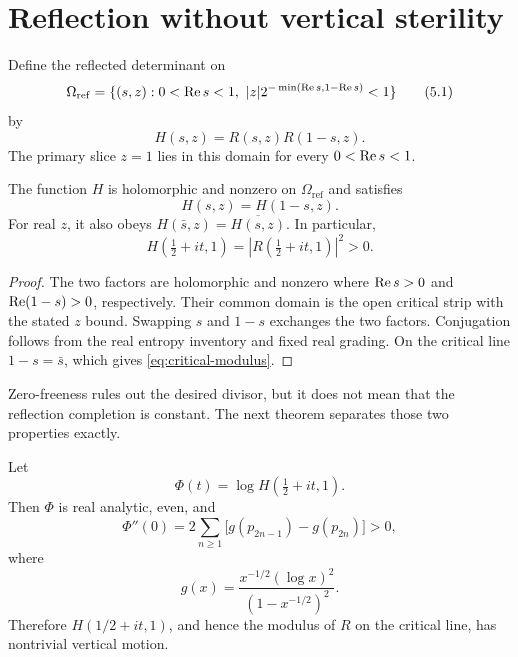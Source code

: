 \section{Reflection without vertical sterility}
\label{sec:reflection}

Define the reflected determinant on
\[
 \Omega_{\mathrm{ref}}=
 \{(s,z):0<\operatorname{Re} s<1,\
 |z|2^{-\min(\operatorname{Re} s,1-\operatorname{Re} s)}<1\}       \tag{5.1}
\]
by
\[
 H(s,z)=R(s,z)R(1-s,z).                         \tag{5.2}
\]
The primary slice $z=1$ lies in this domain for every $0<\operatorname{Re} s<1$.

\begin{theorem}
\label{thm:reflection}
The function $H$ is holomorphic and nonzero on $\Omega_{\mathrm{ref}}$ and
satisfies
\[
 H(s,z)=H(1-s,z).                               \tag{5.3}
\]
For real $z$, it also obeys
$H(\bar s,z)=\overline{H(s,z)}$.  In particular,
\[
 H(\tfrac12+it,1)=|R(\tfrac12+it,1)|^2>0.      \tag{5.4}
 \label{eq:critical-modulus}
\]
\end{theorem}

\begin{proof}
The two factors are holomorphic and nonzero where $\operatorname{Re} s>0$ and
$\operatorname{Re}(1-s)>0$, respectively.  Their common domain is the open critical
strip with the stated $z$ bound.  Swapping $s$ and $1-s$ exchanges the two
factors.  Conjugation follows from the real entropy inventory and fixed real
grading.  On the critical line $1-s=\bar s$, which gives \eqref{eq:critical-modulus}.
\end{proof}

Zero-freeness rules out the desired divisor, but it does not mean that the
reflection completion is constant.  The next theorem separates those two
properties exactly.

\begin{theorem}
\label{thm:motion}
Let
\[
 \Phi(t)=\log H(\tfrac12+it,1).
\]
Then $\Phi$ is real analytic, even, and
\[
 \Phi''(0)=2\sum_{n\ge1}
 \bigl[g(p_{2n-1})-g(p_{2n})\bigr]>0,           \tag{5.5}
 \label{eq:curvature}
\]
where
\[
 g(x)=\frac{x^{-1/2}(\log x)^2}{(1-x^{-1/2})^2}.                    \tag{5.6}
\]
Therefore $H(1/2+it,1)$, and hence the modulus of $R$ on the critical line,
has nontrivial vertical motion.
\end{theorem}

